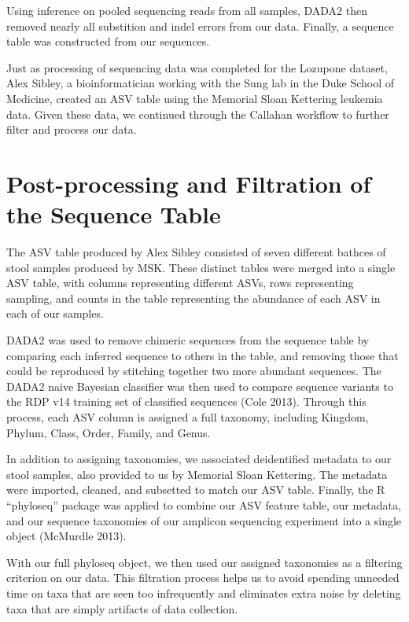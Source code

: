 \documentclass[12pt,twoside]{dukestatscithesis}
\begin{document}
Using inference on pooled sequencing reads from all samples, DADA2 then
removed nearly all substition and indel errors from our data. Finally, a
sequence table was constructed from our sequences.

Just as processing of sequencing data was completed for the Lozupone
dataset, Alex Sibley, a bioinformatician working with the Sung lab in
the Duke School of Medicine, created an ASV table using the Memorial
Sloan Kettering leukemia data. Given these data, we continued through
the Callahan workflow to further filter and process our data.

\chapter{Post-processing and Filtration of the Sequence
Table}\label{post-processing-and-filtration-of-the-sequence-table}

The ASV table produced by Alex Sibley consisted of seven different
bathces of stool samples produced by MSK. These distinct tables were
merged into a single ASV table, with columns representing different
ASVs, rows representing sampling, and counts in the table representing
the abundance of each ASV in each of our samples.

DADA2 was used to remove chimeric sequences from the sequence table by
comparing each inferred sequence to others in the table, and removing
those that could be reproduced by stitching together two more abundant
sequences. The DADA2 naive Bayesian classifier was then used to compare
sequence variants to the RDP v14 training set of classified sequences
(Cole 2013). Through this process, each ASV column is assigned a full
taxonomy, including Kingdom, Phylum, Class, Order, Family, and Genus.

In addition to assigning taxonomies, we associated deidentified metadata
to our stool samples, also provided to us by Memorial Sloan Kettering.
The metadata were imported, cleaned, and subsetted to match our ASV
table. Finally, the R ``phyloseq'' package was applied to combine our
ASV feature table, our metadata, and our sequence taxonomies of our
amplicon sequencing experiment into a single object (McMurdle 2013).

With our full phyloseq object, we then used our assigned taxonomies as a
filtering criterion on our data. This filtration process helps us to
avoid spending unneeded time on taxa that are seen too infrequently and
eliminates extra noise by deleting taxa that are simply artifacts of
data collection.
\end{document}
